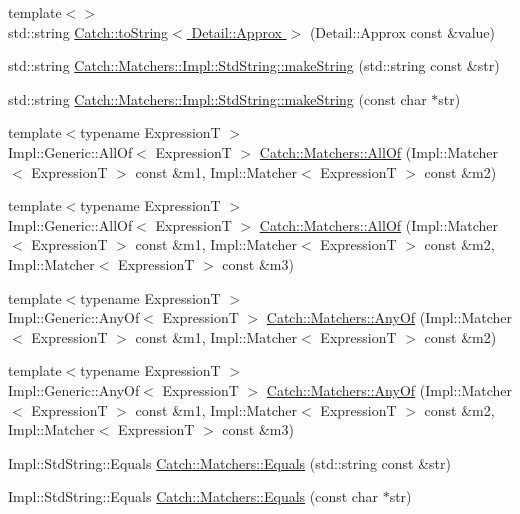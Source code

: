 \begin{DoxyCompactItemize}
\item 
{\footnotesize template$<$$>$ }\\std\+::string \hyperlink{a00117_ac501c2b6bfe82978d699ddda37c53d13}{Catch\+::to\+String$<$ Detail\+::\+Approx $>$} (Detail\+::\+Approx const \&value)
\item 
std\+::string \hyperlink{a00124_a1c41960bd2b455975e7be3cb87878fef}{Catch\+::\+Matchers\+::\+Impl\+::\+Std\+String\+::make\+String} (std\+::string const \&str)
\item 
std\+::string \hyperlink{a00124_a42a104fb88baf158ed3b7d0d422afdaa}{Catch\+::\+Matchers\+::\+Impl\+::\+Std\+String\+::make\+String} (const char $\ast$str)
\item 
{\footnotesize template$<$typename Expression\+T $>$ }\\Impl\+::\+Generic\+::\+All\+Of$<$ Expression\+T $>$ \hyperlink{a00121_aca6c1c17e137d989583c97f99705797a}{Catch\+::\+Matchers\+::\+All\+Of} (Impl\+::\+Matcher$<$ Expression\+T $>$ const \&m1, Impl\+::\+Matcher$<$ Expression\+T $>$ const \&m2)
\item 
{\footnotesize template$<$typename Expression\+T $>$ }\\Impl\+::\+Generic\+::\+All\+Of$<$ Expression\+T $>$ \hyperlink{a00121_a990366f7d62d10d9752ad7b24230def0}{Catch\+::\+Matchers\+::\+All\+Of} (Impl\+::\+Matcher$<$ Expression\+T $>$ const \&m1, Impl\+::\+Matcher$<$ Expression\+T $>$ const \&m2, Impl\+::\+Matcher$<$ Expression\+T $>$ const \&m3)
\item 
{\footnotesize template$<$typename Expression\+T $>$ }\\Impl\+::\+Generic\+::\+Any\+Of$<$ Expression\+T $>$ \hyperlink{a00121_a9cb139c71b9e391d5fc017764695bf84}{Catch\+::\+Matchers\+::\+Any\+Of} (Impl\+::\+Matcher$<$ Expression\+T $>$ const \&m1, Impl\+::\+Matcher$<$ Expression\+T $>$ const \&m2)
\item 
{\footnotesize template$<$typename Expression\+T $>$ }\\Impl\+::\+Generic\+::\+Any\+Of$<$ Expression\+T $>$ \hyperlink{a00121_a8efb0e533db973b8aff1172fb908db02}{Catch\+::\+Matchers\+::\+Any\+Of} (Impl\+::\+Matcher$<$ Expression\+T $>$ const \&m1, Impl\+::\+Matcher$<$ Expression\+T $>$ const \&m2, Impl\+::\+Matcher$<$ Expression\+T $>$ const \&m3)
\item 
Impl\+::\+Std\+String\+::\+Equals \hyperlink{a00121_acfe75df863ee6f2672c88c7d2e662b2e}{Catch\+::\+Matchers\+::\+Equals} (std\+::string const \&str)
\item 
Impl\+::\+Std\+String\+::\+Equals \hyperlink{a00121_aea3565202c7f6e73cc6c647dd813306e}{Catch\+::\+Matchers\+::\+Equals} (const char $\ast$str)

\end{DoxyCompactItemize}
